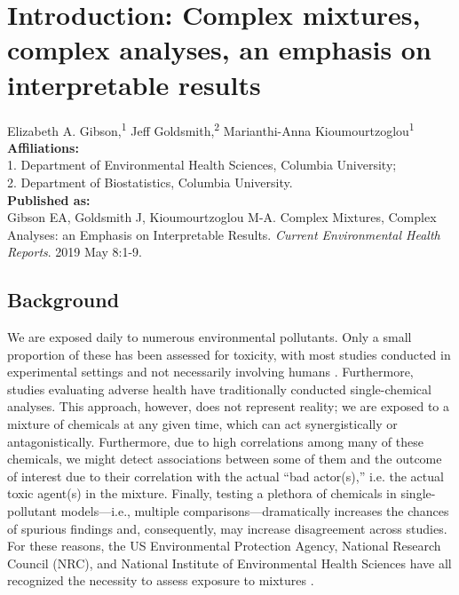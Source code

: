\chapter[Introduction]{Introduction: Complex mixtures, complex analyses, an emphasis on interpretable results}\label{sec:ch1}
\vspace{-3em}

\begin{center}
Elizabeth A. Gibson,\textsuperscript{1} 
Jeff Goldsmith,\textsuperscript{2} 
Marianthi-Anna Kioumourtzoglou\textsuperscript{1} \\

\textbf{Affiliations:} \\ 
1. Department of Environmental Health Sciences, Columbia University; \\ 
2. Department of Biostatistics, Columbia University. \\ 

\textbf{Published as:} \\
Gibson EA, Goldsmith J, Kioumourtzoglou M-A. Complex Mixtures, Complex Analyses: an Emphasis on Interpretable Results. \textit{Current Environmental Health Reports}. 2019 May 8:1-9.
\end{center}
\label{sec:intro}

\clearpage

\section{Background}\label{sec:Intro}

We are exposed daily to numerous environmental pollutants. Only a small proportion of these has been assessed for toxicity, with most studies conducted in experimental settings and not necessarily involving humans \cite{grandjean06}. Furthermore, studies evaluating adverse health have traditionally conducted single-chemical analyses. This approach, however, does not represent reality; we are exposed to a mixture of chemicals at any given time, which can act synergistically or antagonistically. Furthermore, due to high correlations among many of these chemicals, we might detect associations between some of them and the outcome of interest due to their correlation with the actual ``bad actor(s),'' i.e. the actual toxic agent(s) in the mixture. Finally, testing a plethora of chemicals in single-pollutant models---i.e., multiple comparisons---dramatically increases the chances of spurious findings and, consequently, may increase disagreement across studies. For these reasons, the US Environmental Protection Agency, National Research Council (NRC), and National Institute of Environmental Health Sciences have all recognized the necessity to assess exposure to mixtures \cite{epaSP, nrc}.

